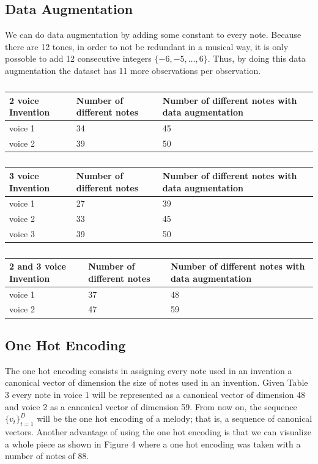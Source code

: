 \documentclass{article}
\begin{document}
\subsection*{Data Augmentation}
We can do data augmentation by adding some constant to every note. Because there are 12 tones, in order to not be redundant in a musical way, it is only possoble to add 12 consecutive integers $\{-6,-5,\dots,6\}$. Thus, by doing this data augmentation the dataset has 11 more observations per observation.
\begin{table}[H]
\begin{tabular}{|l|l|l|}
\hline
2 voice Invention & Number of different notes & Number of different notes with data augmentation \\ \hline
voice 1 & 34 & 45 \\ \hline
voice 2 & 39 & 50 \\ \hline
\end{tabular}
\caption{}
\end{table}


\begin{table}[H]
\begin{tabular}{|l|l|l|}
\hline
3 voice Invention & Number of different notes & Number of different notes with data augmentation \\ \hline
voice 1 & 27 & 39 \\ \hline
voice 2 & 33 & 45 \\ \hline
voice 3 & 39 & 50 \\ \hline
\end{tabular}
\caption{}
\end{table}

\begin{table}[H]
\begin{tabular}{|l|l|l|}
\hline
2 and 3 voice Invention & Number of different notes & Number of different notes with data augmentation \\ \hline
voice 1 & 37 & 48 \\ \hline
voice 2 & 47 & 59 \\ \hline
\end{tabular}
\caption{}
\end{table}

\subsection*{One Hot Encoding}
The one hot encoding consists in assigning every note used in an invention a canonical vector of dimension the size of notes used in an invention. Given Table 3 every note in voice 1 will be represented as a canonical vector of dimension 48 and voice 2 as a canonical vector of dimension 59. From now on, the sequence $\{v_t\}_{t=1}^D$ will be the one hot encoding of a melody; that is, a sequence of canonical vectors.  
\noindent
Another advantage of using the one hot encoding is that we can visualize a whole piece as shown in Figure 4 where a one hot encoding was taken with a number of notes of 88.
\end{document}
